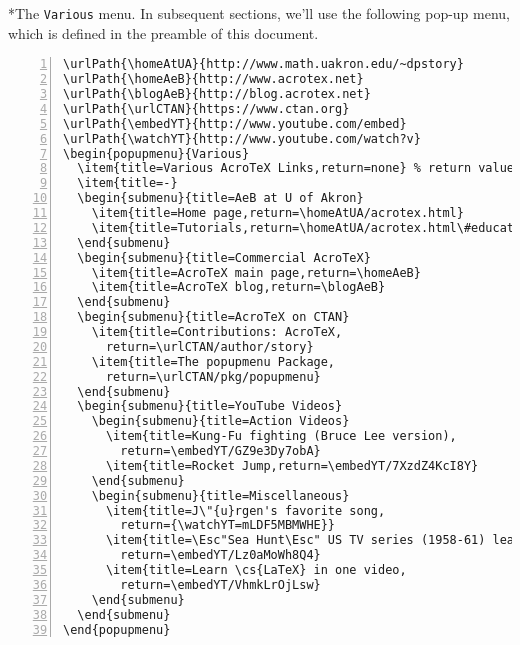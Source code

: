 \documentclass{article}
\makeatletter
\renewcommand*{\theparagraph}{\texorpdfstring{\protect\P\protect\ }{\textparagraph}}
\renewcommand{\paragraph}
    {\renewcommand{\@seccntformat}[1]{\theparagraph}%
    \@startsection{paragraph}{4}{0pt}{6pt}{-3pt}{\bfseries}} %
\makeatother
\begin{document}
\paragraph*{The \texttt{Various} menu.}\label{para:Various}
In subsequent sections, we'll use the following pop-up menu, which is defined
in the preamble of this document.
\begin{Verbatim}[fontsize=\small,numbers=left]
\urlPath{\homeAtUA}{http://www.math.uakron.edu/~dpstory}
\urlPath{\homeAeB}{http://www.acrotex.net}
\urlPath{\blogAeB}{http://blog.acrotex.net}
\urlPath{\urlCTAN}{https://www.ctan.org}
\urlPath{\embedYT}{http://www.youtube.com/embed}
\urlPath{\watchYT}{http://www.youtube.com/watch?v}
\begin{popupmenu}{Various}
  \item{title=Various AcroTeX Links,return=none} % return value of 'none'
  \item{title=-}
  \begin{submenu}{title=AeB at U of Akron}
    \item{title=Home page,return=\homeAtUA/acrotex.html}
    \item{title=Tutorials,return=\homeAtUA/acrotex.html\#educational}
  \end{submenu}
  \begin{submenu}{title=Commercial AcroTeX}
    \item{title=AcroTeX main page,return=\homeAeB}
    \item{title=AcroTeX blog,return=\blogAeB}
  \end{submenu}
  \begin{submenu}{title=AcroTeX on CTAN}
    \item{title=Contributions: AcroTeX,
      return=\urlCTAN/author/story}
    \item{title=The popupmenu Package,
      return=\urlCTAN/pkg/popupmenu}
  \end{submenu}
  \begin{submenu}{title=YouTube Videos}
    \begin{submenu}{title=Action Videos}
      \item{title=Kung-Fu fighting (Bruce Lee version),
        return=\embedYT/GZ9e3Dy7obA}
      \item{title=Rocket Jump,return=\embedYT/7XzdZ4KcI8Y}
    \end{submenu}
    \begin{submenu}{title=Miscellaneous}
      \item{title=J\"{u}rgen's favorite song,
        return={\watchYT=mLDF5MBMWHE}}
      \item{title=\Esc"Sea Hunt\Esc" US TV series (1958-61) lead-in,
        return=\embedYT/Lz0aMoWh8Q4}
      \item{title=Learn \cs{LaTeX} in one video,
        return=\embedYT/VhmkLrOjLsw}
    \end{submenu}
  \end{submenu}
\end{popupmenu}
\end{Verbatim}
\end{document}
